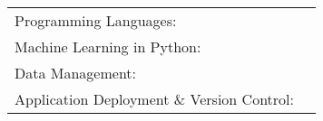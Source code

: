 \documentclass[]{awesome-cv}
\begin{document}
\vspace{-5mm}
\vspace{-3mm}
\begin{cventries}
	\cventry
	{}
	{\def\arraystretch{1.15}{\begin{tabular}{ l l }
		Programming Languages:  & {\skill{ Python, Java, R}} \\
		Machine Learning in Python:  & {\skill{ Pytorch, Pytorch Lightning, NumPy, Sickit-Learn, Fastai}} \\
		Data Management:  & {\skill{ Pandas, SQL, MS Excel}} \\
		Application Deployment \& Version Control:  & {\skill{ Docker, Google Cloud, Git, Singularity}} \\
		\end{tabular}}}
	{}
	{}
	{}
\end{cventries}
\end{document}
